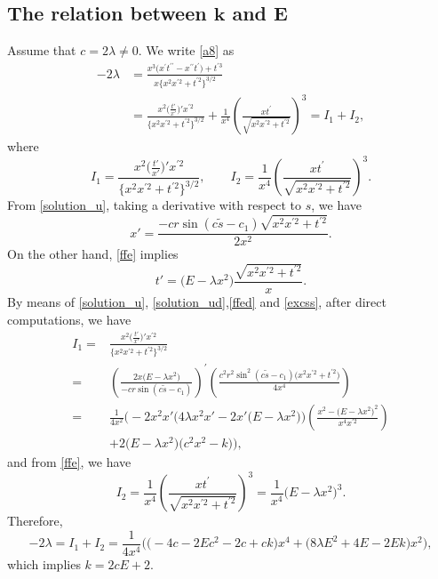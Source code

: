 \documentclass[10pt,a4paper]{amsart}
\numberwithin{equation}{section}
\begin{document}
\subsection[The relation between k and E]{The relation between $\boldsymbol{k}$ and $\boldsymbol{E}$}
Assume that $c=2\lambda\neq 0$. We write \eqref{a8} as
\begin{align}
-2\lambda&=\frac{x^{3}\bigl(x^{\prime }t^{\prime \prime }-x^{\prime \prime
}t^{\prime }\bigr)+t^{\prime 3}}{x\big\{x^2x^{\prime 2}+t^{\prime 2}\big\}^{3/2}}\nonumber\\
&=\frac{x^{2}\bigl(\frac{t'}{x'}\bigr)'x^{\prime 2}}{\big\{x^2x^{\prime 2}+t^{\prime 2}\big\}^{3/2}}+\frac{1}{x^4}\left(\frac{xt^{\prime}}{\sqrt{x^{2}x^{\prime 2}+t^{\prime 2}}}\right)^3=I_1+I_2,\label{pmce}
\end{align}
where \[I_1=\frac{x^{2}\bigl(\frac{t'}{x'}\bigr)'x^{\prime 2}}{\big\{x^2x^{\prime 2}+t^{\prime 2}\big\}^{3/2}},\qquad I_2=\frac{1}{x^4}\left(\frac{xt^{\prime}}{\sqrt{x^{2}x^{\prime 2}+t^{\prime 2}}}\right)^3.\]
From \eqref{solution_u}, taking a derivative with respect to $s$, we have
\begin{equation}\label{solution_ud}
x'=\frac{-cr\sin{(c\tilde{s}-c_1)}\sqrt{x^2x^{\prime 2}+t^{\prime 2}}}{2x^2}.
\end{equation}
On the other hand, \eqref{ffe} implies
\begin{equation}\label{ffed}
t'=\bigl(E-\lambda x^2\bigr)\frac{\sqrt{x^2x^{\prime 2}+t^{\prime 2}}}{x}.
\end{equation}
By means of \eqref{solution_u}, \eqref{solution_ud},\eqref{ffed} and \eqref{excss}, after direct computations, we have
\begin{align*}
I_1={}&\frac{x^{2}\bigl(\frac{t'}{x'}\bigr)'x^{\prime 2}}{\big\{x^2x^{\prime 2}+t^{\prime 2}\big\}^{3/2}}\\
={}&\left(\frac{2x\bigl(E-\lambda x^2\bigr)}{-cr\sin{(c\tilde{s}-c_1)}}\right)^{\prime}\left(\frac{c^{2}r^{2}\sin^{2}{(c\tilde{s}-c_1)}\bigl(x^2x^{\prime 2}+t^{\prime 2}\bigr)}{4x^4}\right)\\
={}&\frac{1}{4x^2}\Biggl(-2x^{2}x'\bigl(4\lambda x^{2}x'-2x'\bigl(E-\lambda x^{2}\bigr)\bigr)\left(\frac{x^{2}-\bigl(E-\lambda x^{2}\bigr)^{2}}{x^{4}x^{\prime 2}}\right) \\
& +2\bigl(E-\lambda x^{2}\bigr)\bigl(c^{2}x^{2}-k\bigr)\Biggr),
\end{align*}
and from \eqref{ffe}, we have
\begin{equation*}
I_2=\frac{1}{x^4}\left(\frac{xt^{\prime}}{\sqrt{x^{2}x^{\prime 2}+t^{\prime 2}}}\right)^3=\frac{1}{x^{4}}\bigl(E-\lambda x^{2}\bigr)^3.
\end{equation*}
Therefore,
\[
-2\lambda=I_1+I_2=\frac{1}{4x^4}\bigl(\bigl(-4c-2Ec^{2}-2c+ck\bigr)x^4+\bigl(8\lambda E^{2}+4E-2Ek\bigr)x^2\bigr),
\]
which implies
$
k=2cE+2$.
\end{document}
